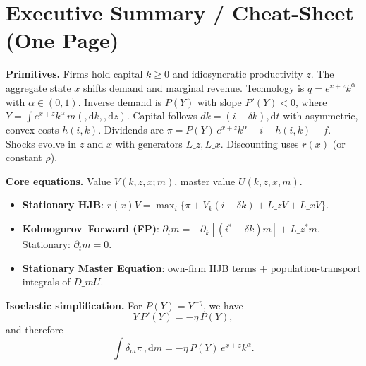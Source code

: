 ﻿\documentclass[11pt,letterpaper,oneside]{article}
\numberwithin{equation}{section}
\newcommand{\1}{\mathbf{1}}
\newcommand{\diff}{,\mathrm{d}}
\newcommand{\Lz}{L\_z}
\newcommand{\Lx}{L\_x}
\newcommand{\Lzadj}{L\_z^{\!*}}
\newcommand{\dmU}{D\_m U}
\begin{document}
\clearpage
\newpage
\section*{Executive Summary / Cheat-Sheet (One Page)}
\begin{tcolorbox}[didacticstyle]
\textbf{Primitives.} Firms hold capital $k\!\ge 0$ and idiosyncratic productivity $z$. The aggregate state $x$ shifts demand and marginal revenue. Technology is $q=e^{x+z}k^\alpha$ with $\alpha\in(0,1)$. Inverse demand is $P(Y)$ with slope $P'(Y)<0$, where $Y=\int e^{x+z}k^\alpha\,m(\diff k,\diff z)$. Capital follows $dk=(i-\delta k)\diff t$ with asymmetric, convex costs $h(i,k)$. Dividends are $\pi = P(Y)\,e^{x+z}k^\alpha - i - h(i,k) - f$. Shocks evolve in $z$ and $x$ with generators $\Lz,\Lx$. Discounting uses $r(x)$ (or constant $\rho$).
\medskip

\textbf{Core equations.} Value $V(k,z,x;m)$, master value $U(k,z,x,m)$.
\begin{itemize}[leftmargin=1.25em]
\item \textbf{Stationary HJB}: $r(x)V=\max_i\{\pi+V_k(i-\delta k)+\Lz V+\Lx V\}$.
\item \textbf{Kolmogorov--Forward (FP)}: $\partial_t m=-\partial_k[(i^*-\delta k)m]+\Lzadj m$. Stationary: $\partial_t m=0$.
\item \textbf{Stationary Master Equation}: own-firm HJB terms $+$ population-transport integrals of $\dmU$.

\end{itemize}


\textbf{Isoelastic simplification.} For $P(Y)=Y^{-\eta}$, we have
\[
Y\,P'(Y)=-\eta\,P(Y),
\]
and therefore
\[
\int \delta_m \pi\,\diff m = -\eta\,P(Y)\,e^{x+z}k^\alpha.
\]


\end{tcolorbox}
\end{document}
